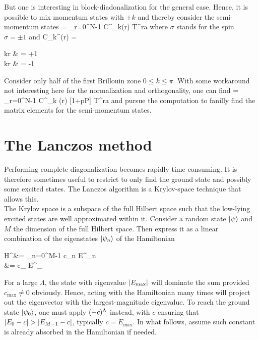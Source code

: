  		But one is interesting in block-diadonalization for the general case. Hence, it is possible to mix momentum states with $\pm k$ and thereby consider the semi-momentum states
 		\be{} =  \sum_{r=0}^{N-1} C^\sigma_k(r) T^r\ket a \ee
 		where $\sigma$ stands for the spin $\sigma = \pm 1$ and
 		\be C_k^\sigma (r) = \begin{cases} \cos kr & \sigma = +1 \\ \sin kr & \sigma = -1 \end{cases} \ee
 		Consider only half of the first Brillouin zone $0 \leq k \leq \pi$. With some workaround not interesting here for the normalization and orthogonality, one can find
 		\be {} =  \sum_{r=0}^{N-1} C^\sigma_k (r) [1+pP] T^r\ket a \ee
 		and pursue the computation to fanilly find the matrix elements for the semi-momentum states.

 	\section{The Lanczos method}

 		Performing complete diagonalization becomes rapidly time consuming. It is therefore sometimes useful to restrict to only find the ground state and possibly some excited states. The Lanczos algorithm is a Krylov-space technique that allows this. \\

 		The Krylov space is a subspace of the full Hilbert space such that the low-lying excited states are well approximated within it. Consider a random state $\ket \psi$ and $M$ the dimension of the full Hilbert space. Then express it as a linear combination of the eigenstates $\ket{\psi_n}$ of the Hamiltonian
 		\be \begin{split} \mc H^\Lambda \ket \psi &= \sum_{n=0}^{M-1} c_n E^\Lambda_n  \\ &= c_ E^\Lambda_ \end{split} \ee
 		For a large $\Lambda$, the state with eigenvalue $\abs{E_\text{max}}$ will dominate the sum provided $c_\text{max}\neq 0$ obviously. Hence, acting with the Hamiltonian many times will project out the eigenvector with the largest-magnitude eigenvalue. To reach the ground state $\ket{\psi_0}$, one must apply $(\mathcal -c)^\Lambda$ instead, with $c$ ensuring that $\abs{E_0-c}>\abs{E_{M-1}-c}$, typically $c=E_\text{max}$. In what follows, assume such constant is already absorbed in the Hamiltonian if needed.

